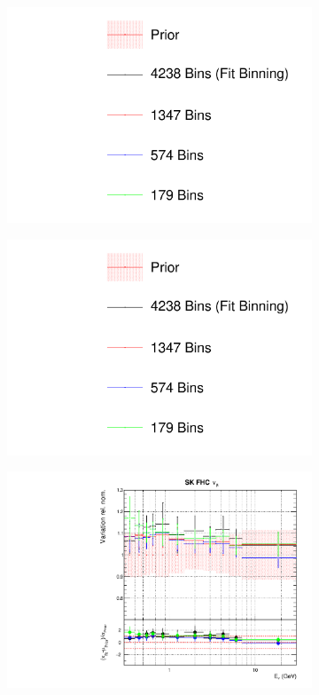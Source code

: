 \begin{figure}[!htbp]
\centering
\begin{subfigure}{0.3\textwidth}
  \centering
  \includegraphics[width=0.8\linewidth, trim={5mm  65mm 0mm 0mm}, clip]{figs/detcovbin_leg}
\end{subfigure}
\begin{subfigure}{0.3\textwidth}
  \centering
  \includegraphics[width=0.8\linewidth, trim={5mm  0mm 0mm 105mm}, clip]{figs/detcovbin_leg}
\end{subfigure}
\begin{subfigure}{0.45\textwidth}
  \centering
  \includegraphics[width=0.75\linewidth]{figs/detcovbinflux_8}

\end{subfigure}
\end{figure}
